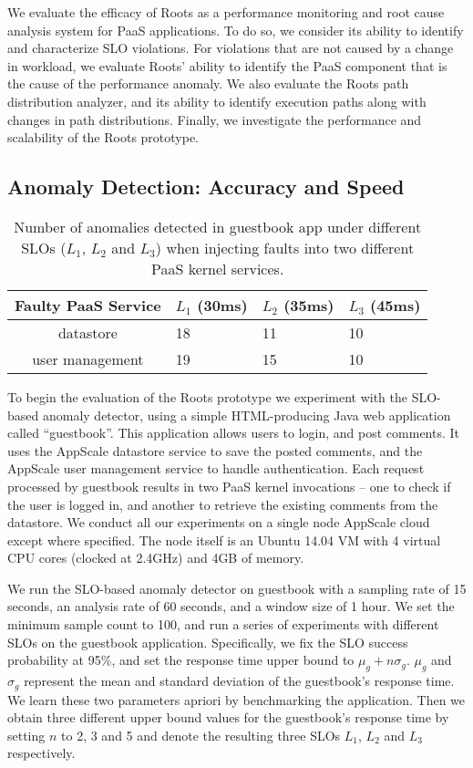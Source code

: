 We evaluate the efficacy of Roots as a performance monitoring and root cause
analysis system for PaaS applications.
To do so, we consider its ability to identify and characterize SLO violations.
For violations that are not caused by a change in workload, we evaluate Roots' ability to identify
the PaaS component that is the cause of the performance anomaly. We also
evaluate the Roots path distribution analyzer, and its ability to identify
execution paths along with changes in path distributions.
Finally, we investigate the performance and scalability of the Roots
prototype. 

\subsection{Anomaly Detection: Accuracy and Speed}

\begin{table}
\begin{center}
\begin{tabular}{|c|p{1cm}|p{1cm}|p{1cm}|}
\hline
Faulty PaaS Service & $L_1$ (30ms) & $L_2$ (35ms) & $L_3$ (45ms) \\ \hline
datastore & 18 & 11 & 10 \\ \hline
user management & 19 & 15 & 10 \\ \hline
\end{tabular}
\end{center}
\caption{Number of anomalies detected in guestbook app under different SLOs 
($L_1$, $L_2$ and $L_3$) when injecting faults into two different PaaS kernel services.
\label{tab:anomaly_counts}
}
\end{table}

To begin the evaluation of the Roots prototype we experiment with
the SLO-based anomaly detector, using a simple HTML-producing Java 
web application called ``guestbook''.
This application allows users to login, and post comments. It uses the
AppScale  datastore service to save
the posted comments, and the AppScale user management service to handle authentication. Each request processed
by guestbook results in two PaaS kernel invocations -- one to check if the user is logged in, and 
another to retrieve the existing comments from the datastore. We conduct all
our experiments on a single node AppScale cloud except where specified. The node itself is an Ubuntu
14.04 VM with 4 virtual CPU cores (clocked at 2.4GHz) and 4GB of memory.

We run the SLO-based anomaly detector on guestbook with a sampling rate of 15 seconds, an analysis
rate of 60 seconds, and a window size of 1 hour. We set the minimum sample count to 100, and
run a series of experiments with different SLOs on the guestbook application. Specifically, we fix
the SLO success probability at 95\%, and set the response time upper bound to $\mu_g + n\sigma_g$. 
$\mu_g$ and $\sigma_g$ represent the mean and standard deviation of the
guestbook's response time. We learn these two parameters apriori by benchmarking
the application. Then we obtain three different upper bound values for the guestbook's
response time by setting 
$n$ to 2, 3 and 5 and denote the resulting three SLOs $L_1$, $L_2$ and $L_3$ respectively.

